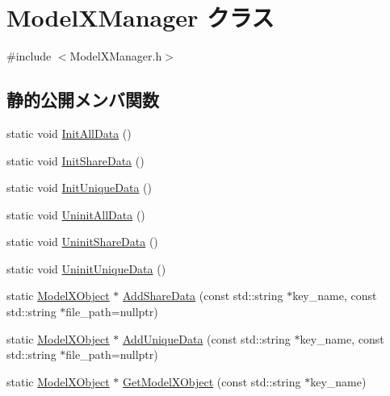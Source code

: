 \hypertarget{class_model_x_manager}{}\section{Model\+X\+Manager クラス}
\label{class_model_x_manager}


{\ttfamily \#include $<$Model\+X\+Manager.\+h$>$}

\subsection*{静的公開メンバ関数}
\begin{DoxyCompactItemize}
\item 
static void \mbox{\hyperlink{class_model_x_manager_a8d7965d9eaa41fcf0297eebea287ee82}{Init\+All\+Data}} ()
\item 
static void \mbox{\hyperlink{class_model_x_manager_a8096a9ed1b19c41270df944aa855015a}{Init\+Share\+Data}} ()
\item 
static void \mbox{\hyperlink{class_model_x_manager_a9bed6cb5ffcd2cbfec6c405e21af362e}{Init\+Unique\+Data}} ()
\item 
static void \mbox{\hyperlink{class_model_x_manager_a915bf3c57058e235d91db06f3fe5f538}{Uninit\+All\+Data}} ()
\item 
static void \mbox{\hyperlink{class_model_x_manager_a9e3d0dc8addebebc87f450cde6c5e659}{Uninit\+Share\+Data}} ()
\item 
static void \mbox{\hyperlink{class_model_x_manager_a7dde269502f40b7d1208c8e0f84b13f0}{Uninit\+Unique\+Data}} ()
\item 
static \mbox{\hyperlink{class_model_x_object}{Model\+X\+Object}} $\ast$ \mbox{\hyperlink{class_model_x_manager_a395565622dff14d4ff80bf64611f9a36}{Add\+Share\+Data}} (const std\+::string $\ast$key\+\_\+name, const std\+::string $\ast$file\+\_\+path=nullptr)
\item 
static \mbox{\hyperlink{class_model_x_object}{Model\+X\+Object}} $\ast$ \mbox{\hyperlink{class_model_x_manager_a0a0cd728e7b92de6c18e96026708d97b}{Add\+Unique\+Data}} (const std\+::string $\ast$key\+\_\+name, const std\+::string $\ast$file\+\_\+path=nullptr)
\item 
static \mbox{\hyperlink{class_model_x_object}{Model\+X\+Object}} $\ast$ \mbox{\hyperlink{class_model_x_manager_a70cc89b8314e5e91b74770606c734c97}{Get\+Model\+X\+Object}} (const std\+::string $\ast$key\+\_\+name)
\end{DoxyCompactItemize}


